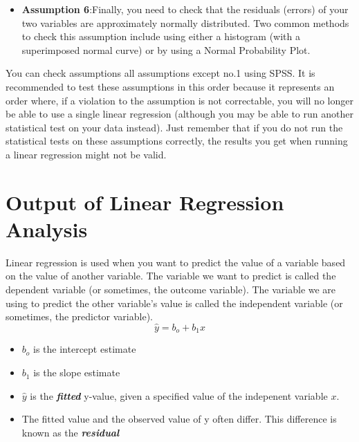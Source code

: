 \begin{itemize}

\item \textbf{Assumption 6}:Finally, you need to check that the residuals (errors) of your two variables are approximately normally distributed. Two common methods to check this assumption include using either a histogram (with a superimposed normal curve) or by using a Normal Probability Plot.

\end{itemize}
You can check assumptions all assumptions except no.1 using SPSS. It is recommended to test these assumptions in this order because it represents an order where, if a violation to the assumption is not correctable, you will no longer be able to use a single linear regression (although you may be able to run another statistical test on your data instead). Just remember that if you do not run the statistical tests on these assumptions correctly, the results you get when running a linear regression might not be valid.


\newpage

\section{Output of Linear Regression Analysis}
Linear regression is used when you want to predict the value of a variable based on the value of another variable. The variable we want to predict is called the dependent variable (or sometimes, the outcome variable). The variable we are using to predict the other variable's value is called the independent variable (or sometimes, the predictor variable).
\[ \hat{y} = b_o + b_1 x \]
\begin{itemize}
\item $b_o$ is the intercept estimate
\item $b_1$ is the slope estimate
\item $\hat{y}$ is the \textbf{\textit{fitted}} y-value, given a specified value of the indepenent variable $x$.
\item The fitted value and the observed value of y often differ. This difference is known as the \textbf{\textit{residual}}
\end{itemize}

